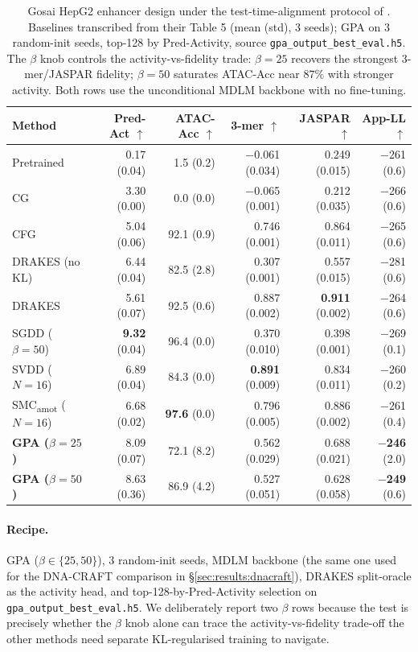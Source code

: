 \documentclass{article}
\theoremstyle{definition}
\theoremstyle{remark}
\newcommand{\gpa}{\textsc{GPA}\xspace}
\newcommand{\drakes}{\textsc{DRAKES}\xspace}
\newcommand{\svdd}{\textsc{SVDD}\xspace}
\newcommand{\dnacraft}{\textsc{DNA-CRAFT}\xspace}
\newcommand{\smcamot}{\textsc{SMC}\textsubscript{amot}\xspace}
\newcommand{\sgdd}{\textsc{SGDD}\xspace}
\begin{document}
\begin{table}[t]
\caption{Gosai HepG2 enhancer design under the test-time-alignment protocol of \citet{paniouli2025}. Baselines transcribed from their Table 5 (mean (std), 3 seeds); \gpa{} on 3 random-init seeds, top-128 by Pred-Activity, source \texttt{gpa\_output\_best\_eval.h5}. The $\beta$ knob controls the activity-vs-fidelity trade: $\beta\!=\!25$ recovers the strongest 3-mer/JASPAR fidelity; $\beta\!=\!50$ saturates ATAC-Acc near $87\%$ with stronger activity. Both rows use the unconditional MDLM backbone with no fine-tuning.}
\label{tab:smc_protocol}
\centering
\small
\begin{tabular}{lrrrrr}
\toprule
Method & Pred-Act $\uparrow$ & ATAC-Acc $\uparrow$ & 3-mer $\uparrow$ & JASPAR $\uparrow$ & App-LL $\uparrow$ \\
\midrule
Pretrained                & 0.17 (0.04) & 1.5 (0.2)  & $-$0.061 (0.034) & 0.249 (0.015) & $-$261 (0.6) \\
CG                        & 3.30 (0.00) & 0.0 (0.0)  & $-$0.065 (0.001) & 0.212 (0.035) & $-$266 (0.6) \\
CFG                       & 5.04 (0.06) & 92.1 (0.9) & 0.746 (0.001) & 0.864 (0.011) & $-$265 (0.6) \\
\drakes{} (no KL)         & 6.44 (0.04) & 82.5 (2.8) & 0.307 (0.001) & 0.557 (0.015) & $-$281 (0.6) \\
\drakes{}                 & 5.61 (0.07) & 92.5 (0.6) & 0.887 (0.002) & \textbf{0.911} (0.002) & $-$264 (0.6) \\
\sgdd{} ($\beta\!=\!50$)  & \textbf{9.32} (0.04) & 96.4 (0.0) & 0.370 (0.010) & 0.398 (0.001) & $-$269 (0.1) \\
\svdd{} ($N\!=\!16$)      & 6.89 (0.04) & 84.3 (0.0) & \textbf{0.891} (0.009) & 0.834 (0.011) & $-$260 (0.2) \\
\smcamot{} ($N\!=\!16$)   & 6.68 (0.02) & \textbf{97.6} (0.0) & 0.796 (0.005) & 0.886 (0.002) & $-$261 (0.4) \\
\midrule
\textbf{\gpa{} ($\beta\!=\!25$)}  & 8.09 (0.07) & 72.1 (8.2) & 0.562 (0.029) & 0.688 (0.021) & \textbf{$-$246} (2.0) \\
\textbf{\gpa{} ($\beta\!=\!50$)}  & 8.63 (0.36) & 86.9 (4.2) & 0.527 (0.051) & 0.628 (0.058) & \textbf{$-$249} (0.6) \\
\bottomrule
\end{tabular}
\end{table}

\paragraph{Recipe.}
\gpa{} ($\beta\!\in\!\{25, 50\}$), 3 random-init seeds, MDLM backbone (the same one used for the \dnacraft{} comparison in \S\ref{sec:results:dnacraft}), \drakes{} split-oracle as the activity head, and top-128-by-Pred-Activity selection on \texttt{gpa\_output\_best\_eval.h5}. We deliberately report two $\beta$ rows because the test is precisely whether the $\beta$ knob alone can trace the activity-vs-fidelity trade-off the other methods need separate KL-regularised training to navigate.
\end{document}
